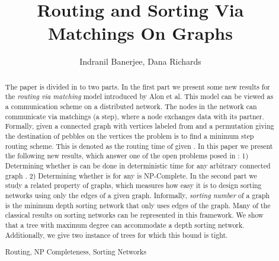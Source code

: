 \documentclass[runningheads,a4paper]{llncs}
\newcommand{\keywords}[1]{\par\addvspace\baselineskip
\noindent\keywordname\enspace\ignorespaces#1}
\begin{document}
\mainmatter  

\title{Routing and Sorting Via Matchings On Graphs}


\author{Indranil Banerjee, Dana Richards}





\maketitle


\begin{abstract}
The paper is divided in to two parts. In the first part we present some new results for the \textit{routing via matching} model introduced by Alon et al\cite{5}. This model can be viewed as a communication scheme on a distributed network. The nodes in the network can communicate via matchings (a step), where a node exchanges data with its partner. Formally, given a connected graph  with vertices labeled from  and a permutation  giving the destination of pebbles on the vertices the problem is to find a minimum step routing scheme. This is denoted as the routing time  of  given .  In this paper we present the following new results, which answer one of the open problems posed in \cite{5}: 1) Determining whether  is  can be done in  deterministic time for any arbitrary connected graph . 2) Determining whether  is  for any  is NP-Complete. In the second part we study a related property of graphs, which measures how easy it is to design sorting networks using only the edges of a given graph. Informally, \textit{sorting number} of a graph is the minimum depth sorting network that only uses edges of the graph. Many of the classical results on sorting networks can be represented in this framework. We show that a tree with maximum degree  can accommodate a  depth sorting network. Additionally, we give two instance of trees for which this bound is tight.  

\keywords{Routing, NP Completeness, Sorting Networks}
\end{abstract}
\end{document}
